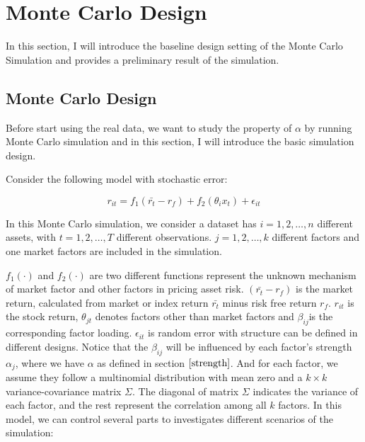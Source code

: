 
%

%

		\section{Monte Carlo Design}\label{MC}
	In this section, I will introduce the baseline design setting of the Monte Carlo Simulation and provides a preliminary result of the simulation.
	
		\subsection{Monte Carlo Design}
	Before start using the real data, we want to study the property of $\alpha$ by running Monte Carlo simulation and in this section, I will introduce the basic simulation design.
	
	Consider the following model with stochastic error:
	
	\[  r_{it} = f_1(\bar{r_{t}} - r_f) + f_2( \theta_{i}x_{t}) +\epsilon_{it} \tag{2}\label{baselineequation} \]
	
	In this Monte Carlo simulation, we consider a dataset has $i = 1, 2,\dots, n$ different assets, with $t= 1, 2,\dots, T$ different observations. 
	$j = 1, 2, \dots, k$ different factors and one market factors are included in the simulation. 
	
	
	$f_1(\cdot)$ and $f_2(\cdot)$ are two different functions represent the unknown mechanism of market factor and other factors in pricing asset risk.
	$(\bar{r_{t}}- r_f) $ is the market return, calculated from market or index return $\bar{r_{t}}$ minus risk free return $r_f$. 
	$r_{it}$ is the stock return, $\theta_{jt}$ denotes factors other than market factors and $\beta_{ij}$is the corresponding factor loading. 
	$\epsilon_{it}$ is random error with structure can be defined in different designs.
	Notice that the $\beta_{ij}$ will be influenced by each factor's strength $\alpha_j$, where we have $\alpha$ as defined in section $\ref{strength}$. 
	And for each factor, we assume they follow a multinomial distribution with mean zero and a $k\times k$ variance-covariance matrix $\Sigma$. 
	The diagonal of matrix $\Sigma$ indicates the variance of each factor, and the rest represent the correlation among all $k$ factors.
	In this model, we can control several parts to investigates different scenarios of the simulation:
